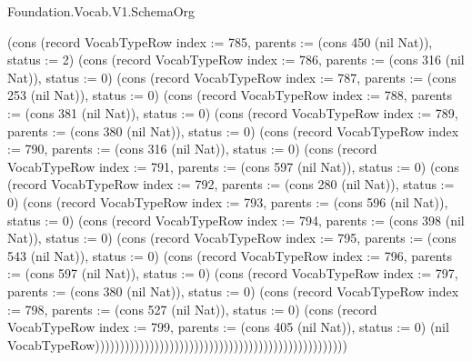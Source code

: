 \begin{lexlean}{Foundation.Vocab.V1.SchemaOrg}
\begin{semanticmodule}
{(cons (record VocabTypeRow {index := 785, parents := (cons 450 (nil Nat)), status := 2}) (cons (record VocabTypeRow {index := 786, parents := (cons 316 (nil Nat)), status := 0}) (cons (record VocabTypeRow {index := 787, parents := (cons 253 (nil Nat)), status := 0}) (cons (record VocabTypeRow {index := 788, parents := (cons 381 (nil Nat)), status := 0}) (cons (record VocabTypeRow {index := 789, parents := (cons 380 (nil Nat)), status := 0}) (cons (record VocabTypeRow {index := 790, parents := (cons 316 (nil Nat)), status := 0}) (cons (record VocabTypeRow {index := 791, parents := (cons 597 (nil Nat)), status := 0}) (cons (record VocabTypeRow {index := 792, parents := (cons 280 (nil Nat)), status := 0}) (cons (record VocabTypeRow {index := 793, parents := (cons 596 (nil Nat)), status := 0}) (cons (record VocabTypeRow {index := 794, parents := (cons 398 (nil Nat)), status := 0}) (cons (record VocabTypeRow {index := 795, parents := (cons 543 (nil Nat)), status := 0}) (cons (record VocabTypeRow {index := 796, parents := (cons 597 (nil Nat)), status := 0}) (cons (record VocabTypeRow {index := 797, parents := (cons 380 (nil Nat)), status := 0}) (cons (record VocabTypeRow {index := 798, parents := (cons 527 (nil Nat)), status := 0}) (cons (record VocabTypeRow {index := 799, parents := (cons 405 (nil Nat)), status := 0}) (nil VocabTypeRow)))))))))))))))))))))))))))))))))))))))))))))))))))
}


\end{semanticmodule}
\end{lexlean}
